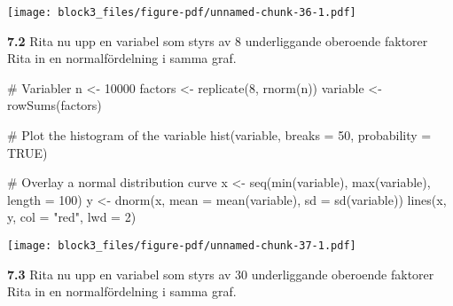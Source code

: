 \documentclass[
  letterpaper,
  DIV=11,
  numbers=noendperiod]{scrartcl}
\newenvironment{Shaded}{\begin{snugshade}}{\end{snugshade}}
\newcommand{\AttributeTok}[1]{\textcolor[rgb]{0.40,0.45,0.13}{#1}}
\newcommand{\CommentTok}[1]{\textcolor[rgb]{0.37,0.37,0.37}{#1}}
\newcommand{\ConstantTok}[1]{\textcolor[rgb]{0.56,0.35,0.01}{#1}}
\newcommand{\DecValTok}[1]{\textcolor[rgb]{0.68,0.00,0.00}{#1}}
\newcommand{\FunctionTok}[1]{\textcolor[rgb]{0.28,0.35,0.67}{#1}}
\newcommand{\NormalTok}[1]{\textcolor[rgb]{0.00,0.23,0.31}{#1}}
\newcommand{\OtherTok}[1]{\textcolor[rgb]{0.00,0.23,0.31}{#1}}
\newcommand{\StringTok}[1]{\textcolor[rgb]{0.13,0.47,0.30}{#1}}
\begin{document}
\texttt{[image: block3\_files/figure-pdf/unnamed-chunk-36-1.pdf]}

\textbf{7.2} Rita nu upp en variabel som styrs av 8 underliggande
oberoende faktorer Rita in en normalfördelning i samma graf.

\begin{Shaded}
\begin{Highlighting}[]
\CommentTok{\# Variabler}
\NormalTok{n }\OtherTok{\textless{}{-}} \DecValTok{10000}
\NormalTok{factors }\OtherTok{\textless{}{-}} \FunctionTok{replicate}\NormalTok{(}\DecValTok{8}\NormalTok{, }\FunctionTok{rnorm}\NormalTok{(n))}
\NormalTok{variable }\OtherTok{\textless{}{-}} \FunctionTok{rowSums}\NormalTok{(factors)}

\CommentTok{\# Plot the histogram of the variable}
\FunctionTok{hist}\NormalTok{(variable, }\AttributeTok{breaks =} \DecValTok{50}\NormalTok{, }\AttributeTok{probability =} \ConstantTok{TRUE}\NormalTok{)}

\CommentTok{\# Overlay a normal distribution curve}
\NormalTok{x }\OtherTok{\textless{}{-}} \FunctionTok{seq}\NormalTok{(}\FunctionTok{min}\NormalTok{(variable), }\FunctionTok{max}\NormalTok{(variable), }\AttributeTok{length =} \DecValTok{100}\NormalTok{)}
\NormalTok{y }\OtherTok{\textless{}{-}} \FunctionTok{dnorm}\NormalTok{(x, }\AttributeTok{mean =} \FunctionTok{mean}\NormalTok{(variable), }\AttributeTok{sd =} \FunctionTok{sd}\NormalTok{(variable))}
\FunctionTok{lines}\NormalTok{(x, y, }\AttributeTok{col =} \StringTok{"red"}\NormalTok{, }\AttributeTok{lwd =} \DecValTok{2}\NormalTok{)}
\end{Highlighting}
\end{Shaded}

\texttt{[image: block3\_files/figure-pdf/unnamed-chunk-37-1.pdf]}

\textbf{7.3} Rita nu upp en variabel som styrs av 30 underliggande
oberoende faktorer Rita in en normalfördelning i samma graf.
\end{document}
